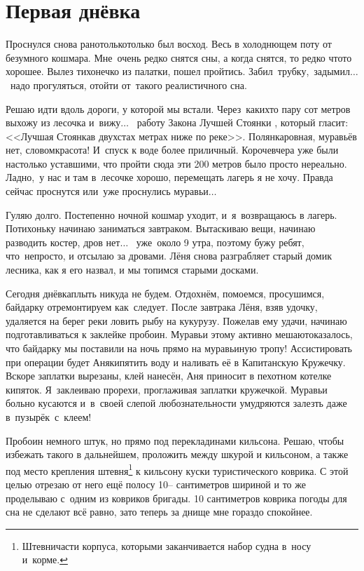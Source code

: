 \chapter{Первая днёвка}
\vepsianrose

Проснулся снова рано\mdash только\sdash только был восход. Весь в холоднющем поту от безумного кошмара. Мне~очень редко снятся сны, а когда снятся, то редко что\sdash то хорошее. Вылез тихонечко из палатки, пошел пройтись. Забил~трубку,~задымил$\ldots$ ~надо прогуляться, отойти от~такого реалистичного сна.

Решаю идти вдоль дороги, у которой мы встали. Через~каких\sdash то пару сот метров выхожу из лесочка и~вижу$\ldots$~ работу Закона Лучшей Стоянки \cite{Квадригин}, который гласит: <<Лучшая Стоянка\mdash в двухстах метрах ниже по реке>>. Полянка\mdash ровная, муравьёв нет, словом\mdash красота! И~спуск к воде более приличный. Короче\mdash вчера уже были настолько уставшими, что пройти сюда эти 200 метров было просто нереально. Ладно,~у нас и там в~лесочке хорошо, перемещать лагерь я не хочу. Правда сейчас проснутся или~уже проснулись муравьи$\ldots$

\newpage
Гуляю долго. Постепенно ночной кошмар уходит, и~я~возвращаюсь в лагерь. Потихоньку начинаю заниматься завтраком. Вытаскиваю вещи, начинаю разводить костер, дров нет$\ldots$~ уже~около 9 утра, поэтому бужу ребят, что~непросто, и отсылаю за дровами. Лёня снова разграбляет старый домик лесника, как я его назвал, и мы топимся старыми досками. 

Сегодня днёвка\mdash плыть никуда не будем. Отдохнём, помоемся, просушимся, байдарку отремонтируем как~следует. После завтрака Лёня, взяв удочку, удаляется на берег реки ловить рыбу на кукурузу. Пожелав ему удачи, начинаю подготавливаться к заклейке пробоин. Муравьи этому активно мешают\mdash оказалось, что байдарку мы поставили на ночь прямо на муравьиную тропу! Ассистировать при операции будет Аня\mdash кипятить воду и наливать её в Капитанскую Кружечку. Вскоре заплатки вырезаны, клей нанесён, Аня приносит в пехотном котелке кипяток. Я~заклеиваю прорехи, проглаживая заплатки кружечкой. Муравьи больно кусаются и~в~своей слепой любознательности умудряются залезть даже в~пузырёк~с~клеем! 

Пробоин немного штук, но прямо под перекладинами кильсона. Решаю, чтобы избежать такого в дальнейшем, проложить между шкурой и кильсоном, а также под место крепления штевня\footnote{Штевни\mdash части корпуса, которыми заканчивается набор судна в~носу и~корме.} к кильсону куски туристического коврика. С этой целью отрезаю от него ещё полосу 10\thinspace-- сантиметров шириной и то же проделываю с~одним из ковриков бригады. 10 сантиметров коврика погоды для сна не сделают всё равно, зато теперь за днище мне гораздо спокойнее.

